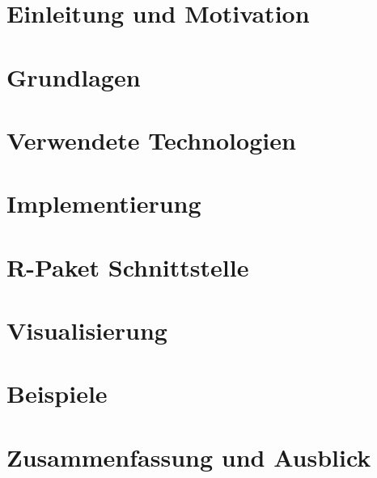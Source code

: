 \chapter{Einleitung und Motivation}
\label{cha:introduction}


\chapter{Grundlagen}
\label{cha:basics}


\chapter{Verwendete Technologien}
\label{cha:technologies}


\chapter{Implementierung}
\label{cha:implementation}


\chapter{R-Paket Schnittstelle}
\label{cha:interface}


\chapter{Visualisierung}
\label{cha:visualization}


\chapter{Beispiele}
\label{cha:examples}


\chapter{Zusammenfassung und Ausblick}
\label{cha:result}
